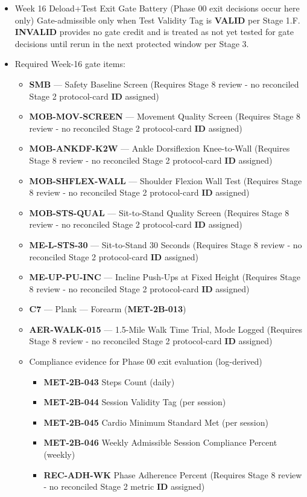 \documentclass[10pt]{article}
\begin{document}
\begin{itemize}
\item Week 16 Deload+Test Exit Gate Battery (Phase 00 exit decisions occur here only)\newline
Gate-admissible only when Test Validity Tag is \textbf{VALID} per Stage 1.F. \textbf{INVALID} provides no gate credit and is treated as not yet tested for gate decisions until rerun in the next protected window per Stage 3.

\item Required Week-16 gate items:
  \begin{itemize}
  \item \textbf{SMB} — Safety Baseline Screen (Requires Stage 8 review - no reconciled Stage 2 protocol-card \textbf{ID} assigned)
  \item \textbf{MOB-MOV-SCREEN} — Movement Quality Screen (Requires Stage 8 review - no reconciled Stage 2 protocol-card \textbf{ID} assigned)
  \item \textbf{MOB-ANKDF-K2W} — Ankle Dorsiflexion Knee-to-Wall (Requires Stage 8 review - no reconciled Stage 2 protocol-card \textbf{ID} assigned)
  \item \textbf{MOB-SHFLEX-WALL} — Shoulder Flexion Wall Test (Requires Stage 8 review - no reconciled Stage 2 protocol-card \textbf{ID} assigned)
  \item \textbf{MOB-STS-QUAL} — Sit-to-Stand Quality Screen (Requires Stage 8 review - no reconciled Stage 2 protocol-card \textbf{ID} assigned)
  \item \textbf{ME-L-STS-30} — Sit-to-Stand 30 Seconds (Requires Stage 8 review - no reconciled Stage 2 protocol-card \textbf{ID} assigned)
  \item \textbf{ME-UP-PU-INC} — Incline Push-Ups at Fixed Height (Requires Stage 8 review - no reconciled Stage 2 protocol-card \textbf{ID} assigned)
  \item \textbf{C7} — Plank — Forearm (\textbf{MET-2B-013})
  \item \textbf{AER-WALK-015} — 1.5-Mile Walk Time Trial, Mode Logged (Requires Stage 8 review - no reconciled Stage 2 protocol-card \textbf{ID} assigned)
  \item Compliance evidence for Phase 00 exit evaluation (log-derived)
    \begin{itemize}
    \item \textbf{MET-2B-043} Steps Count (daily)
    \item \textbf{MET-2B-044} Session Validity Tag (per session)
    \item \textbf{MET-2B-045} Cardio Minimum Standard Met (per session)
    \item \textbf{MET-2B-046} Weekly Admissible Session Compliance Percent (weekly)
    \item \textbf{REC-ADH-WK} Phase Adherence Percent (Requires Stage 8 review - no reconciled Stage 2 metric \textbf{ID} assigned)
    \end{itemize}
  \end{itemize}


\end{itemize}
\end{document}
